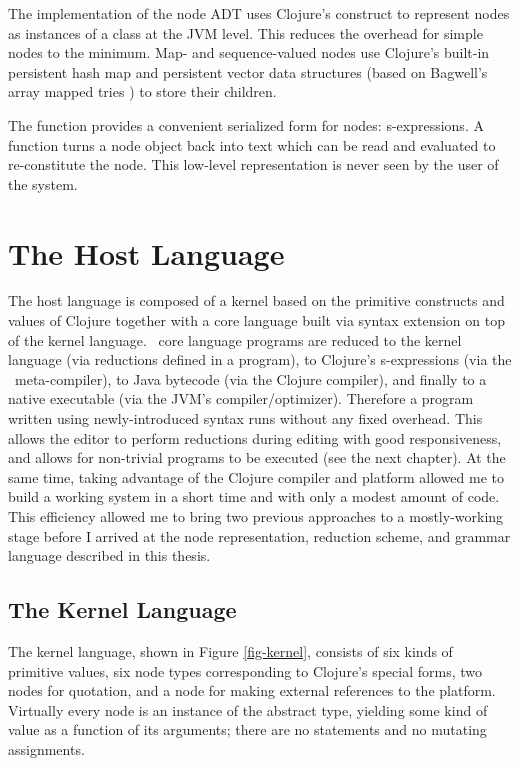 The implementation of the node ADT uses Clojure's  construct to represent nodes as instances of a  class at the JVM level. This reduces the overhead for simple nodes to the minimum. Map- and sequence-valued nodes use Clojure's built-in persistent hash map and persistent vector data structures (based on Bagwell's array mapped tries \cite{bagwell}) to store their children.

The  function provides a convenient serialized form for nodes: s-expressions. A  function turns a node object back into text which can be read and evaluated to re-constitute the node. This low-level representation is never seen by the user of the system.


\section{The Host Language}
\label{host}
The host language is composed of a kernel based on the primitive constructs and values of Clojure together with a core language built via syntax extension on top of the kernel language. \Meta\ core language programs are reduced to the kernel language (via reductions defined in a  program), to Clojure's s-expressions (via the \Meta\ meta-compiler), to Java bytecode (via the Clojure compiler), and finally to a native executable (via the JVM's compiler/optimizer). Therefore a program written using newly-introduced syntax runs without any fixed overhead. This allows the editor to perform reductions during editing with good responsiveness, and allows for non-trivial programs to be executed (see the next chapter). At the same time, taking advantage of the Clojure compiler and platform allowed me to build a working system in a short time and with only a modest amount of code. This efficiency allowed me to bring two previous approaches to a mostly-working stage before I arrived at the node representation, reduction scheme, and grammar language described in this thesis.

\subsection{The Kernel Language}
The kernel language, shown in Figure \ref{fig-kernel}, consists of six kinds of primitive values, six node types corresponding to Clojure's special forms, two nodes for quotation, and a node for making external references to the platform. Virtually every node is an instance of the abstract  type, yielding some kind of value as a function of its arguments; there are no statements and no mutating assignments.

